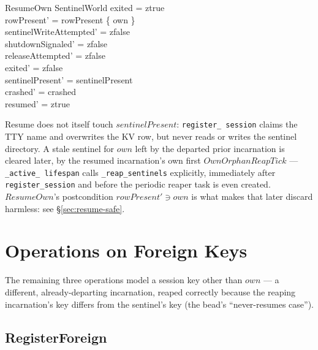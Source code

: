 \documentclass[a4paper,10pt,fleqn]{article}
\begin{document}
\begin{schema}{ResumeOwn}
  \Delta SentinelWorld
  \where
  exited = ztrue \\
  rowPresent' = rowPresent \cup \{ own \} \\
  sentinelWriteAttempted' = zfalse \\
  shutdownSignaled' = zfalse \\
  releaseAttempted' = zfalse \\
  exited' = zfalse \\
  sentinelPresent' = sentinelPresent \\
  crashed' = crashed \\
  resumed' = ztrue
\end{schema}

Resume does not itself touch $sentinelPresent$: \texttt{register\_
session} claims the TTY name and overwrites the KV row, but never reads
or writes the sentinel directory.  A stale sentinel for $own$ left by
the departed prior incarnation is cleared later, by the resumed
incarnation's own first $OwnOrphanReapTick$ --- \texttt{\_active\_
lifespan} calls \texttt{\_reap\_sentinels} explicitly, immediately after
\texttt{register\_session} and before the periodic reaper task is even
created.  $ResumeOwn$'s postcondition $rowPresent' \ni own$ is what
makes that later discard harmless: see \S\ref{sec:resume-safe}.

\section{Operations on Foreign Keys}

The remaining three operations model a session key other than $own$
--- a different, already-departing incarnation, reaped correctly
because the reaping incarnation's key differs from the sentinel's key
(the bead's ``never-resumes case'').

\subsection{RegisterForeign}
\end{document}
